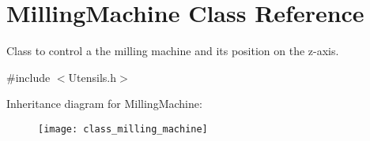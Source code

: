 \hypertarget{class_milling_machine}{\section{Milling\+Machine Class Reference}
\label{class_milling_machine}
}


Class to control a the milling machine and its position on the z-\/axis.  




{\ttfamily \#include $<$Utensils.\+h$>$}

Inheritance diagram for Milling\+Machine\+:\begin{figure}[H]
\begin{center}
\leavevmode
\texttt{[image: class\_milling\_machine]}
\end{center}
\end{figure}
